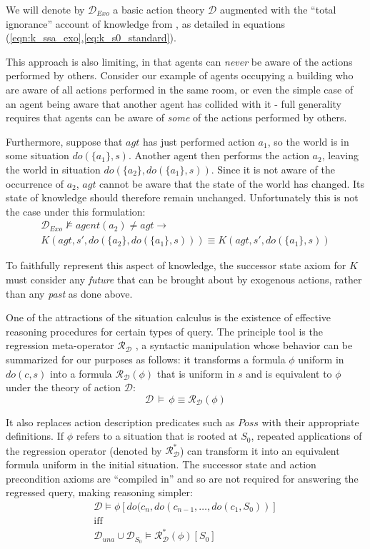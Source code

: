 \documentclass{ifaamas-submission}
\begin{document}
\begin{definition}%
We will denote by $\mathcal{D}_{Exo}$ a basic action theory $\mathcal{D}$
augmented with the {}``total ignorance'' account of knowledge from
\cite{Lesperance99sitcalc_approach}, as detailed in equations (\ref{eqn:k_ssa_exo},\ref{eq:k_s0_standard}).
\end{definition}%
This approach is also limiting, in that agents can \emph{never} be
aware of the actions performed by others. Consider our example of
agents occupying a building who are aware of all actions performed
in the same room, or even the simple case of an agent being aware
that another agent has collided with it - full generality requires
that agents can be aware of \emph{some} of the actions performed by
others.

Furthermore, suppose that $agt$ has just performed action $a_{1}$,
so the world is in some situation $do(\{ a_{1}\},s)$. Another agent
then performs the action $a_{2}$, leaving the world in situation
$do(\{ a_{2}\},do(\{ a_{1}\},s))$. Since it is not aware of the occurrence
of $a_{2}$, $agt$ cannot be aware that the state of the world has
changed. Its state of knowledge should therefore remain unchanged.
Unfortunately this is not the case under this formulation:\begin{multline*}
\mathcal{D}_{Exo}\not\models agent(a_{2})\neq agt\rightarrow\\
K(agt,s',do(\{ a_{2}\},do(\{ a_{1}\},s)))\equiv K(agt,s',do(\{ a_{1}\},s))\end{multline*}


To faithfully represent this aspect of knowledge, the successor state
axiom for $K$ must consider any \emph{future} that can be brought
about by exogenous actions, rather than any \emph{past} as done above.

One of the attractions of the situation calculus is the existence
of effective reasoning procedures for certain types of query. The
principle tool is the regression meta-operator $\mathcal{R}_{\mathcal{D}}$
\cite{pirri99contributions_sitcalc}, a syntactic manipulation whose
behavior can be summarized
for our purposes as follows: it transforms a formula $\phi$ uniform
in $do(c,s)$ into a formula $\mathcal{R}_{\mathcal{D}}(\phi)$ that
is uniform in $s$ and is equivalent to $\phi$ under the theory of
action $\mathcal{D}$:\[
\mathcal{D}\,\models\,\phi\equiv\mathcal{R}_{\mathcal{D}}(\phi)\]

It also replaces action description predicates such as $Poss$ with
their appropriate definitions. If $\phi$ refers to a situation that
is rooted at $S_{0}$, repeated applications of the regression operator
(denoted by $\mathcal{R}_{\mathcal{D}}^{*}$) can transform it into
an equivalent formula uniform in the initial situation. The successor
state and action precondition axioms are {}``compiled in'' and so
are not required for answering the regressed query, making reasoning
simpler:\begin{gather*}
\mathcal{D}\models\phi[do(c_{n},do(c_{n-1},\dots,do(c_{1},S_{0}))]\\
\mathrm{iff}\\
\mathcal{D}_{una}\cup\mathcal{D}_{S_{0}}\models\mathcal{R}_{\mathcal{D}}^{*}(\phi)[S_{0}]\end{gather*}
\end{document}
